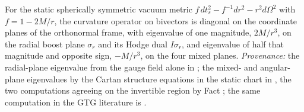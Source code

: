 For the static spherically symmetric vacuum metric $f\,dt_s^2 - f^{-1}dr^2 - r^2 d\Omega^2$ with $f = 1 - 2M/r$, the curvature operator on bivectors is diagonal on the coordinate planes of the orthonormal frame, with eigenvalue of one magnitude, $2M/r^3$, on the radial boost plane $\sigma_r$ and its Hodge dual $I\sigma_r$, and eigenvalue of half that magnitude and opposite sign, $-M/r^3$, on the four mixed planes. \emph{Provenance:} the radial-plane eigenvalue from the gauge field alone in \cite[Prop.~2.4(1)]{ButlerT5}; the mixed- and angular-plane eigenvalues by the Cartan structure equations in the static chart in \cite[App.~A]{ButlerT5}, the two computations agreeing on the invertible region by Fact ; the same computation in the GTG literature is \cite[Ch.~14]{DoranLasenby2003}.
